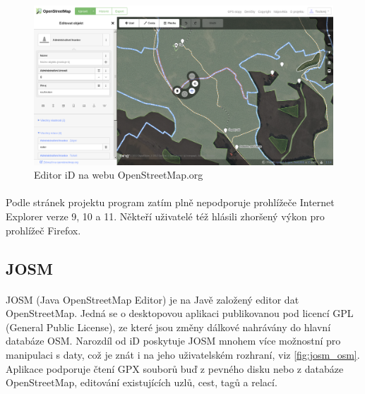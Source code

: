 \documentclass[11pt,a4paper,titlepage,oneside]{book}
\begin{document}
		\begin{figure}[!h]
			\begin{center}
				\includegraphics[width=12cm]{obrazky/iD_osm.png}
				\caption{Editor iD na webu OpenStreetMap.org}
				\label{fig:iD_osm}
			\end{center}
		\end{figure}

			\paragraph{} Podle stránek projektu\cite{wiki_iD} program zatím plně nepodporuje prohlížeče Internet Explorer verze 9, 10 a 11. Někteří uživatelé též hlásili zhoršený výkon pro prohlížeč Firefox.

		\subsection{JOSM}
			\paragraph{}JOSM (Java OpenStreetMap Editor) je na Javě založený editor dat OpenStreetMap. Jedná se o desktopovou aplikaci publikovanou pod licencí GPL (General Public License), ze které jsou změny dálkové nahrávány do hlavní databáze OSM. Narozdíl od iD poskytuje JOSM mnohem více možnostní pro manipulaci s daty, což je znát i na jeho uživatelském rozhraní, viz \ref{fig:josm_osm}. Aplikace podporuje čtení GPX souborů buď z pevného disku nebo z databáze OpenStreetMap, editování existujících uzlů, cest, tagů a relací.

\end{document}
